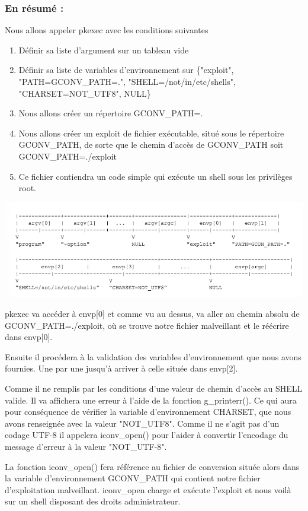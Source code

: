 \documentclass[12pt,a4paper]{article}
\begin{document}
\begin{flushleft}
            \subsubsection{En résumé : }
            \item Nous allons appeler pkexec avec les conditions suivantes
            \begin{enumerate}
                \item Définir sa liste d'argument sur un tableau vide
                \item Définir sa liste de variables d'environnement sur \{"exploit", "PATH=GCONV\_PATH=.", "SHELL=/not/in/etc/shells", "CHARSET=NOT\_UTF8", NULL\}
                \item Nous allons créer un répertoire GCONV\_PATH=.
                \item Nous allons créer un exploit de fichier exécutable, situé sous le répertoire GCONV\_PATH, de sorte que le chemin d'accès de GCONV\_PATH soit GCONV\_PATH=./exploit
                \item Ce fichier contiendra un code simple qui exécute un shell sous les privilèges root.
            \end{enumerate}
            \begin{center}
                    \includegraphics[scale=0.5]{pile d'appel programme final} 
            \end{center}
            \item pkexec va accéder à envp[0] et comme vu au dessus, va aller au chemin absolu de GCONV\_PATH=./exploit, où se trouve notre fichier malveillant et le réécrire dans envp[0].
            \item Ensuite il procédera à la validation des variables d'environnement que nous avons fournies. Une par une jusqu'à arriver à celle située dans envp[2].
            \item Comme il ne remplis par les conditions d'une valeur de chemin d'accès au SHELL valide. Il va affichera une erreur à l'aide de la fonction g\_printerr(). Ce qui aura pour conséquence de vérifier la variable d'environnement CHARSET, que nous avons renseignée avec la valeur "NOT\_UTF8". Comme il ne s'agit pas d'un codage UTF-8 il appelera iconv\_open() pour l'aider à convertir l'encodage du message d'erreur à la valeur "NOT\_UTF-8".
            \item La fonction iconv\_open() fera référence au fichier de conversion située alors dans la variable d'environnement GCONV\_PATH qui contient notre fichier d'exploitation malveillant. iconv\_open charge et exécute l'exploit et nous voilà sur un shell disposant des droits administrateur.

    \end{flushleft}
       \newpage
\end{document}
